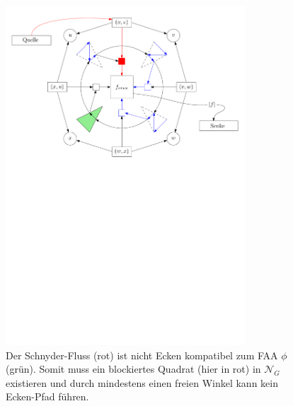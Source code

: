 \begin{figure}
	\centering
  	\includegraphics[width=0.8\textwidth]{combined_face_not_corner.pdf}
  	\caption{Der Schnyder-Fluss (rot) ist nicht Ecken kompatibel zum FAA $\phi$ (grün). Somit muss ein blockiertes Quadrat (hier in rot) in $\mathcal{N}_G$ existieren und durch mindestens einen freien Winkel kann kein Ecken-Pfad führen.}
	\label{combined_face_not_corner}
\end{figure}

